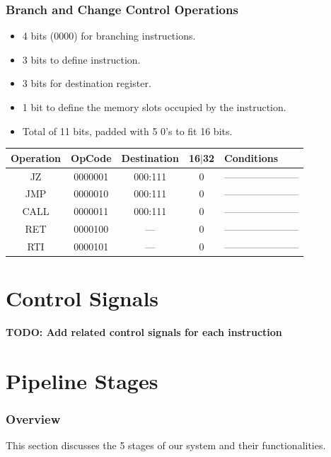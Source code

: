 \documentclass[12pt]{report}
\begin{document}
\section{Branch and Change Control Operations}
\begin{itemize}
    \item 4 bits (0000) for branching instructions.
    \item 3 bits to define instruction.
    \item 3 bits for destination register.
    \item 1 bit to define the memory slots occupied by the instruction.
    \item Total of 11 bits, padded with 5 0's to fit 16 bits. 
\end{itemize}
\begin{center}
 \begin{tabular}{||c| c| c| c| p{40mm}||} 
 \hline
 Operation & OpCode & Destination & 16$|$32 & Conditions  \\ [0.5ex] 
 \hline\hline
 JZ & 0000001 & 000:111 & 0 & ----------------------- \\
 \hline
 JMP & 0000010 & 000:111 & 0 & ----------------------- \\
 \hline
 CALL & 0000011 & 000:111 & 0 & ----------------------- \\
 \hline
 RET & 0000100 & --- & 0 & ----------------------- \\
 \hline
 RTI & 0000101 & --- & 0 & ----------------------- \\
 \hline
\end{tabular}
\end{center}

\part{Control Signals}
\textbf{TODO: Add related control signals for each instruction}

\part{Pipeline Stages}

\section{Overview}
This section discusses the 5 stages of our system and their functionalities.
\end{document}
